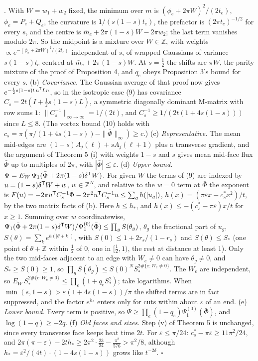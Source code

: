 \documentclass[11pt,a4paper]{article}
\begin{document}
. With \(W=w_1+w_2\) fixed, the minimum over \(m\) is
\((\phi_e+2\pi W)^2/(2t_e)\), \(\phi_e=P_e+Q_e\), the curvature is
\(1/(s(1-s)t_e)\), the prefactor is \((2\pi t_e)^{-1/2}\) for every
\(s\), and the centre is \(\bar m_e+2\pi(1-s)W-2\pi w_2\); the last term
vanishes modulo \(2\pi\). So the midpoint is a mixture over
\(W\in\mathbb Z\), with weights
\(\propto e^{-(\phi_e+2\pi W)^2/(2t_e)}\) independent of \(s\), of
wrapped Gaussians of variance \(s(1-s)t_e\) centred at
\(\bar m_e+2\pi(1-s)W\). At \(s=\frac12\) the shifts are \(\pi W\), the
parity mixture of the proof of Proposition 4, and \(q_e\) obeys
Proposition 3's bound for every \(s\). (b) \emph{Covariance.} The
Gaussian average of that proof now gives
\(e^{-\frac12s(1-s)t\,n^{\sf T}Ln}\), so in the isotropic case (9) has
covariance \(C_s=2t(I+\frac12s(1-s)L)\), a symmetric diagonally dominant
M-matrix with row sums \(1\): \(\|C_s^{-1}\|_{\infty\to\infty}=1/(2t)\),
and \(C_s^{-1}\ge1/(2t(1+4s(1-s)))\) since \(L\le8\). (The vortex bound
(10) holds with \(c_s=\pi(\pi/(1+4s(1-s))-\|\bar\Phi\|_\infty)\ge c\).)
(c) \emph{Representative.} The mean mid-edges are
\((1-s)A_j(\ell)+sA_j(\ell+1)\) plus a transverse gradient, and the
argument of Theorem 5 (i) with weights \(1-s\) and \(s\) gives mean
mid-face flux \(\bar\Phi\) up to multiples of \(2\pi\), with
\(|\bar\Phi|\le\varepsilon\). (d) \emph{Upper bound.}
\(\Psi=E_W\,\Psi_1(\bar\Phi+2\pi(1-s)\delta^{\sf T}W)\). For given \(W\)
the terms of (9) are indexed by \(u=(1-s)\delta^{\sf T}W+w\),
\(w\in\mathbb Z^N\), and relative to the \(w=0\) term at \(\bar\Phi\)
the exponent is
\(F(u)=-2\pi u^{\sf T}C_s^{-1}\bar\Phi-2\pi^2u^{\sf T}C_s^{-1}u\le\sum_gh(|u_g|)\),
\(h(x)=(\pi\varepsilon x-c^*_sx^2)/t\), by the two matrix facts of (b).
Here \(h\le h_*\), and \(h(x)\le-(c^*_s-\pi\varepsilon)x/t\) for
\(x\ge1\). Summing over \(w\) coordinatewise,
\(\Psi_1(\bar\Phi+2\pi(1-s)\delta^{\sf T}W)/\Psi_1^{(0)}(\bar\Phi)\le\prod_gS(\theta_g)\),
\(\theta_g\) the fractional part of \(u_g\),
\(S(\theta)=\sum_ke^{h(|\theta+k|)}\), with \(S(0)\le1+2r_s/(1-r_s)\)
and \(S(\theta)\le S_*\) (one point of \(\theta+\mathbb Z\) within
\(\frac12\) of \(0\), one in \([\frac12,1)\), the rest at distance at
least \(1\)). Only the two mid-faces adjacent to an edge with
\(W_e\ne0\) can have \(\theta_g\ne0\), and \(S_*\ge S(0)\ge1\), so
\(\prod_gS(\theta_g)\le S(0)^NS_*^{2\#\{e:W_e\ne0\}}\). The \(W_e\) are
independent, so \(E_W\,S_*^{2\#\{e:W_e\ne0\}}\le\prod_e(1+q_eS_*^2)\);
take logarithms. When \(\min(s,1-s)>\varepsilon(1+4s(1-s))/\pi\) the
shifted terms are in fact suppressed, and the factor \(e^{h_*}\) enters
only for cuts within about \(\varepsilon\) of an end. (e) \emph{Lower
bound.} Every term is positive, so
\(\Psi\ge\prod_e(1-q_e)\Psi_1^{(0)}(\bar\Phi)\), and
\(\log(1-q)\ge-2q\). (f) \emph{Old faces and sizes.} Step (v) of Theorem
5 is unchanged, since every transverse face keeps heat time \(2t\). For
\(\varepsilon\le\pi/24\): \(c^*_s-\pi\varepsilon\ge11\pi^2/24\), and
\(2\pi(\pi-\varepsilon)-2th_*\ge2\pi^2\cdot\frac{23}{24}-\frac{\pi^2}{576}>\pi^2/8\),
although \(h_*=\varepsilon^2/(4t)\cdot(1+4s(1-s))\) grows like
\(t^{-2\delta}\). \(\square\)
\end{document}

